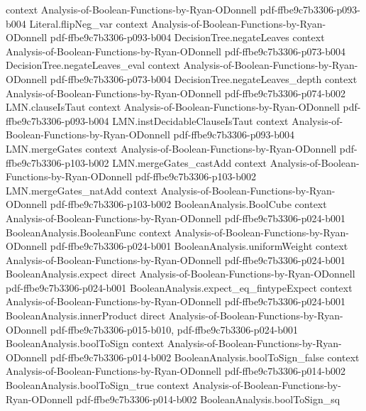 \begin{theorem}
  {context}
  {Analysis-of-Boolean-Functions-by-Ryan-ODonnell}
  {pdf-ffbe9c7b3306-p093-b004}
\proofstep
  {Literal.flipNeg_var}
  {context}
  {Analysis-of-Boolean-Functions-by-Ryan-ODonnell}
  {pdf-ffbe9c7b3306-p093-b004}
\proofstep
  {DecisionTree.negateLeaves}
  {context}
  {Analysis-of-Boolean-Functions-by-Ryan-ODonnell}
  {pdf-ffbe9c7b3306-p073-b004}
\proofstep
  {DecisionTree.negateLeaves_eval}
  {context}
  {Analysis-of-Boolean-Functions-by-Ryan-ODonnell}
  {pdf-ffbe9c7b3306-p073-b004}
\proofstep
  {DecisionTree.negateLeaves_depth}
  {context}
  {Analysis-of-Boolean-Functions-by-Ryan-ODonnell}
  {pdf-ffbe9c7b3306-p074-b002}
\proofstep
  {LMN.clauseIsTaut}
  {context}
  {Analysis-of-Boolean-Functions-by-Ryan-ODonnell}
  {pdf-ffbe9c7b3306-p093-b004}
\proofstep
  {LMN.instDecidableClauseIsTaut}
  {context}
  {Analysis-of-Boolean-Functions-by-Ryan-ODonnell}
  {pdf-ffbe9c7b3306-p093-b004}
\proofstep
  {LMN.mergeGates}
  {context}
  {Analysis-of-Boolean-Functions-by-Ryan-ODonnell}
  {pdf-ffbe9c7b3306-p103-b002}
\proofstep
  {LMN.mergeGates_castAdd}
  {context}
  {Analysis-of-Boolean-Functions-by-Ryan-ODonnell}
  {pdf-ffbe9c7b3306-p103-b002}
\proofstep
  {LMN.mergeGates_natAdd}
  {context}
  {Analysis-of-Boolean-Functions-by-Ryan-ODonnell}
  {pdf-ffbe9c7b3306-p103-b002}
\proofstep
  {BooleanAnalysis.BoolCube}
  {context}
  {Analysis-of-Boolean-Functions-by-Ryan-ODonnell}
  {pdf-ffbe9c7b3306-p024-b001}
\proofstep
  {BooleanAnalysis.BooleanFunc}
  {context}
  {Analysis-of-Boolean-Functions-by-Ryan-ODonnell}
  {pdf-ffbe9c7b3306-p024-b001}
\proofstep
  {BooleanAnalysis.uniformWeight}
  {context}
  {Analysis-of-Boolean-Functions-by-Ryan-ODonnell}
  {pdf-ffbe9c7b3306-p024-b001}
\proofstep
  {BooleanAnalysis.expect}
  {direct}
  {Analysis-of-Boolean-Functions-by-Ryan-ODonnell}
  {pdf-ffbe9c7b3306-p024-b001}
\proofstep
  {BooleanAnalysis.expect_eq_fintypeExpect}
  {context}
  {Analysis-of-Boolean-Functions-by-Ryan-ODonnell}
  {pdf-ffbe9c7b3306-p024-b001}
\proofstep
  {BooleanAnalysis.innerProduct}
  {direct}
  {Analysis-of-Boolean-Functions-by-Ryan-ODonnell}
  {pdf-ffbe9c7b3306-p015-b010,
    pdf-ffbe9c7b3306-p024-b001}
\proofstep
  {BooleanAnalysis.boolToSign}
  {context}
  {Analysis-of-Boolean-Functions-by-Ryan-ODonnell}
  {pdf-ffbe9c7b3306-p014-b002}
\proofstep
  {BooleanAnalysis.boolToSign_false}
  {context}
  {Analysis-of-Boolean-Functions-by-Ryan-ODonnell}
  {pdf-ffbe9c7b3306-p014-b002}
\proofstep
  {BooleanAnalysis.boolToSign_true}
  {context}
  {Analysis-of-Boolean-Functions-by-Ryan-ODonnell}
  {pdf-ffbe9c7b3306-p014-b002}
\proofstep
  {BooleanAnalysis.boolToSign_sq}

\end{theorem}
